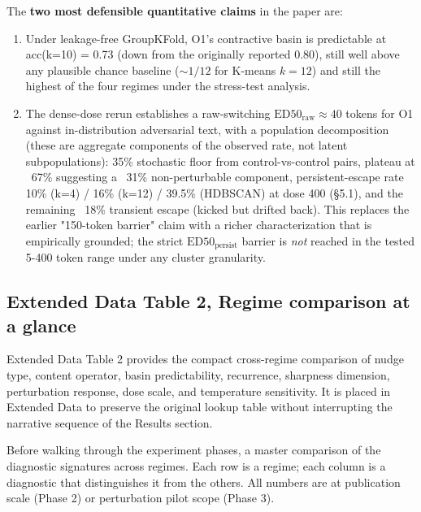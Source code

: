 \documentclass{article}
\theoremstyle{plain}
\theoremstyle{definition}
\begin{document}
The \textbf{two most defensible quantitative claims} in the paper are:
\begin{enumerate}
  \item Under leakage-free GroupKFold, O1's contractive basin is
   predictable at acc(k=10) = 0.73 (down from the originally
   reported 0.80), still well above any plausible chance baseline
   ($\sim 1/12$ for K-means $k=12$) and still the highest of the
   four regimes under the stress-test analysis.
  \item The dense-dose rerun establishes a raw-switching
   $\mathrm{ED50}_{\mathrm{raw}} \approx 40$ tokens for O1 against
   in-distribution adversarial text, with a population
   decomposition (these are aggregate components of the observed
   rate, not latent subpopulations): 35\% stochastic floor from
   control-vs-control pairs, plateau at ~67\% suggesting a ~31\%
   non-perturbable component, persistent-escape rate 10\% (k=4) /
   16\% (k=12) / 39.5\% (HDBSCAN) at dose 400 (§5.1), and the
   remaining ~18\% transient escape (kicked but drifted back).
   This replaces the earlier "150-token barrier" claim with a
   richer characterization that is empirically grounded; the strict
   $\mathrm{ED50}_{\mathrm{persist}}$ barrier is \textit{not} reached in
   the tested 5-400 token range under any cluster granularity.
\end{enumerate}


\subsection{Extended Data Table 2, Regime comparison at a glance}

Extended Data Table 2 provides the compact cross-regime comparison of
nudge type, content operator, basin predictability, recurrence,
sharpness dimension, perturbation response, dose scale, and
temperature sensitivity. It is placed in Extended Data to preserve the
original lookup table without interrupting the narrative sequence of
the Results section.

Before walking through the experiment phases, a master comparison
of the diagnostic signatures across regimes. Each row is a regime;
each column is a diagnostic that distinguishes it from the others.
All numbers are at publication scale (Phase 2) or perturbation pilot
scope (Phase 3).
\end{document}
